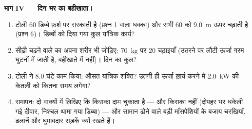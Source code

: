 \begin{problem}
\medskip
\noindent\textbf{भाग IV --- दिन भर का बहीखाता।}
\begin{enumerate}[resume]
  \item टोली $60$ डिब्बे फ़र्श पर सरकाती है (प्रश्न 1 वाला धक्का) और
        सभी $60$ को \qty{9.0}{m} ऊपर चढ़ाती है (प्रश्न 6)। डिब्बों को दिया गया
        कुल यांत्रिक कार्य?
  \item सीढ़ी चढ़ने वाले का अपना शरीर भी जोड़िए: \qty{70}{kg} पर $20$ चढ़ाइयाँ
        (उतरने पर लौटी ऊर्जा गरम घुटनों में जाती है, बहीखाते में नहीं)। दिन
        का कुल?
  \item टोली ने $8.0$ घंटे काम किया: औसत यांत्रिक शक्ति? उतनी ही
        ऊर्जा ख़र्च करने में \qty{2.0}{kW} की केतली को कितना समय लगेगा?
  \item समापन: दो वाक्यों में लिखिए कि  किसका दाम चुकाता है ---
        और किसका नहीं (दोपहर भर धकेली गई दीवार, निश्चल थामा गया डिब्बा) ---
        और सामान ढोने वाले बड़ी माँसपेशियों के बजाय चरखियाँ, ढलानें और
        घुमावदार सड़कें क्यों रखते हैं।
\end{enumerate}
\end{problem}
